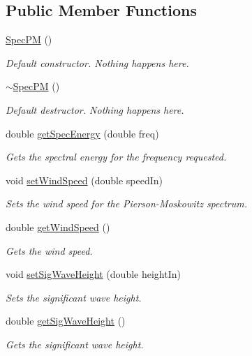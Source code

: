 \subsection*{Public Member Functions}
\begin{DoxyCompactItemize}
\item 
\hyperlink{classosea_1_1_spec_p_m_a682697b1a1e44629805e0e3a124e0326}{Spec\-P\-M} ()
\begin{DoxyCompactList}\small\item\em Default constructor. Nothing happens here. \end{DoxyCompactList}\item 
\hyperlink{classosea_1_1_spec_p_m_ad92a92475d4405dbcae526ff88b760db}{$\sim$\-Spec\-P\-M} ()
\begin{DoxyCompactList}\small\item\em Default destructor. Nothing happens here. \end{DoxyCompactList}\item 
double \hyperlink{classosea_1_1_spec_p_m_a209ebd698f3761ff2e870203f31218a6}{get\-Spec\-Energy} (double freq)
\begin{DoxyCompactList}\small\item\em Gets the spectral energy for the frequency requested. \end{DoxyCompactList}\item 
void \hyperlink{classosea_1_1_spec_p_m_ad0be8d372c6a91f654535b8725f664aa}{set\-Wind\-Speed} (double speed\-In)
\begin{DoxyCompactList}\small\item\em Sets the wind speed for the Pierson-\/\-Moskowitz spectrum. \end{DoxyCompactList}\item 
double \hyperlink{classosea_1_1_spec_p_m_a90436918258243f82a783a9255753bc3}{get\-Wind\-Speed} ()
\begin{DoxyCompactList}\small\item\em Gets the wind speed. \end{DoxyCompactList}\item 
void \hyperlink{classosea_1_1_spec_p_m_a14b4c9972323e2157dbe811a1c9581df}{set\-Sig\-Wave\-Height} (double height\-In)
\begin{DoxyCompactList}\small\item\em Sets the significant wave height. \end{DoxyCompactList}\item 
double \hyperlink{classosea_1_1_spec_p_m_a7041a1ba0ae840eadfc34dedd2bcb551}{get\-Sig\-Wave\-Height} ()
\begin{DoxyCompactList}\small\item\em Gets the significant wave height. \end{DoxyCompactList}\end{DoxyCompactItemize}
